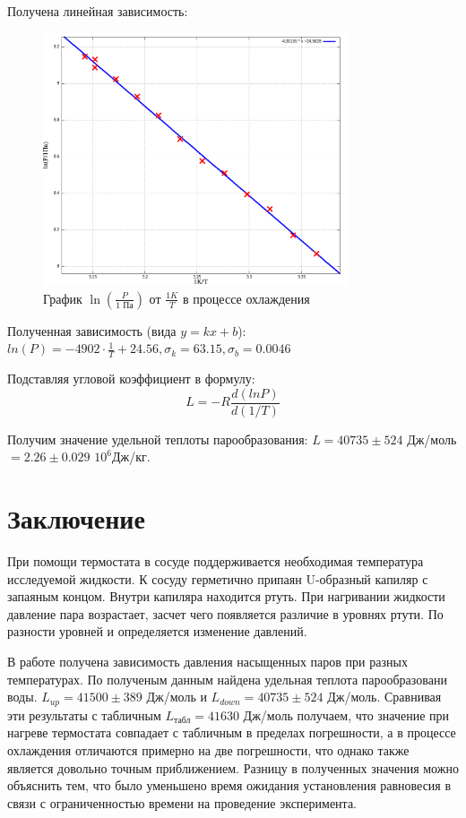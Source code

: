 \documentclass[a4paper,10pt]{article} %
\begin{document}
Получена линейная зависимость: 
\begin{figure}[H]
	\centering
	\includegraphics[width=0.8\textwidth]{2-4-1-4-res.png}
	\caption{График $\ln \left(\frac{P}{\text{1 Па}}\right)$ от $\frac{1K}{T}$ в процессе охлаждения}
\end{figure}


Полученная зависимость (вида $y = kx + b$): $ln(P) = -4902\cdot \frac{1}{T} + 24.56, \sigma_k = 63.15, 
\sigma_b = 0.0046$


Подставляя угловой коэффициент в формулу:
\[ L = -R\frac{d(lnP)}{d(1/T)} \]

Получим значение удельной теплоты парообразования: $L = 40735 \pm 524$ Дж/моль $= 2.26 \pm 0.029$ $10^6$Дж/кг.




\section{Заключение}

	При помощи термостата в  сосуде поддерживается необходимая температура исследуемой жидкости. К сосуду герметично 
	припаян U-образный капиляр с запаяным концом. Внутри капиляра находится ртуть. При нагривании жидкости давление 
	пара возрастает, засчет чего появляется различие в уровнях ртути. По разности уровней и определяется изменение давлений. 

	В работе получена зависимость давления насыщенных паров при разных температурах. По полученым данным найдена удельная 
	теплота парообразовани воды. $L_{up} = 41500 \pm 389$ Дж/моль и $L_{down} = 40735 \pm 524$ Дж/моль. Сравнивая эти 
	результаты с табличным $L_{\text{табл}} = 41630$ Дж/моль получаем, что значение при нагреве термостата совпадает с 
	табличным в пределах погрешности, а в процессе охлаждения отличаются примерно на две погрешности, что однако также 
	является довольно точным приближением. Разницу в полученных значения можно объяснить тем, что было уменьшено время 
	ожидания установления равновесия в связи с ограниченностью времени на проведение эксперимента.
\end{document}
